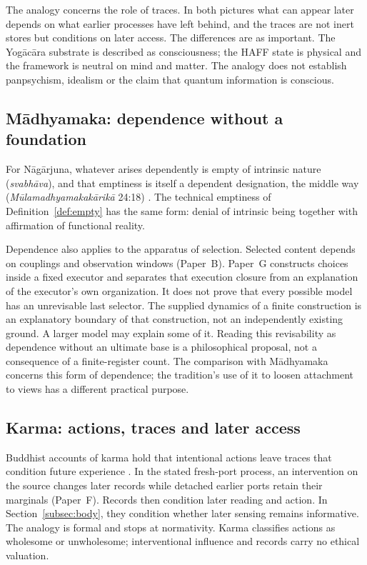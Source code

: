 \documentclass[11pt,a4paper]{article}
\begin{document}
The analogy concerns the role of traces. In both pictures what can appear later depends on what earlier processes have left behind, and the traces are not inert stores but conditions on later access. The differences are as important. The Yog\=ac\=ara substrate is described as consciousness; the HAFF state is physical and the framework is neutral on mind and matter. The analogy does not establish panpsychism, idealism or the claim that quantum information is conscious.

\subsection{M\=adhyamaka: dependence without a foundation}

For N\=ag\=arjuna, whatever arises dependently is empty of intrinsic nature (\emph{svabh\=ava}), and that emptiness is itself a dependent designation, the middle way (\emph{M\=ulamadhyamakak\=arik\=a} 24:18) \cite{Nagarjuna_MMK_Garfield1995,Garfield2002,Siderits2007}. The technical emptiness of Definition~\ref{def:empty} has the same form: denial of intrinsic being together with affirmation of functional reality.

Dependence also applies to the apparatus of selection. Selected
content depends on couplings and observation windows (Paper~B).
Paper~G constructs choices inside a fixed executor and separates
that execution closure from an explanation of the executor's own
organization. It does not prove that every possible model has an
unrevisable last selector. The supplied dynamics of a finite
construction is an explanatory boundary of that construction, not an
independently existing ground. A larger model may explain some of
it. Reading this revisability as dependence without an ultimate base
is a philosophical proposal, not a consequence of a finite-register
count. The comparison with M\=adhyamaka concerns this form of
dependence; the tradition's use of it to loosen attachment to views
has a different practical purpose.

\subsection{Karma: actions, traces and later access}

Buddhist accounts of karma hold that intentional actions leave traces that condition future experience \cite{Gombrich1996,Harvey2000}. In the stated fresh-port process, an intervention on the source changes
later records while detached earlier ports retain their marginals
(Paper~F). Records then condition later reading and action.
In Section~\ref{subsec:body}, they condition whether later sensing
remains informative. The analogy is formal and stops at normativity. Karma classifies actions as wholesome or unwholesome; interventional influence and records carry no ethical valuation.
\end{document}
